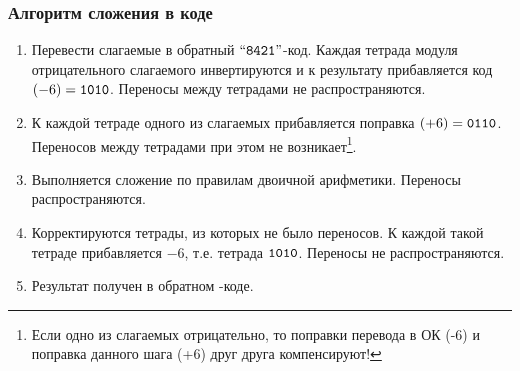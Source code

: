 \begin{frame}
    \frametitle{Алгоритм сложения в коде \NaturalLabel}

    \begin{enumerate}
        \item Перевести слагаемые в обратный $\text{``\texttt{8421}''}$-код. Каждая тетрада модуля отрицательного слагаемого инвертируются и к результату прибавляется код $(-6)=\texttt{1010}$. Переносы между тетрадами не распространяются.
        \item К каждой тетраде одного из слагаемых прибавляется поправка $(+6)=\texttt{0110}$. Переносов между тетрадами при этом не возникает\footnote{Если одно из слагаемых отрицательно, то поправки перевода в ОК (-6) и поправка данного шага (+6) друг друга компенсируют!}.
        \item Выполняется сложение по правилам двоичной арифметики. Переносы распространяются.
        \item Корректируются тетрады, из которых не было переносов. К каждой такой тетраде прибавляется $-6$, т.е. тетрада $\texttt{1010}$. Переносы не распространяются.
        \item Результат получен в обратном \NaturalLabel-коде.
    \end{enumerate}
\end{frame}

